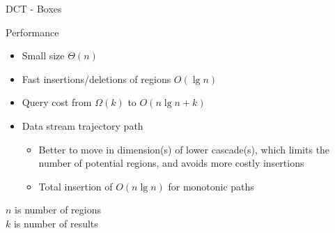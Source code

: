 \documentclass[final,total,bgColor,slideColor,pdf,ps2pdf,default,noaccumulate]{prosper}
\begin{document}
% 

% 

\begin{slide}{DCT - Boxes}
  \centering
  \scalebox{0.8}{}
\end{slide}

\begin{slide}[R]{Performance}
  \begin{itemize}    
  \item Small size $\Theta(n)$
  \item Fast insertions/deletions of regions $O(\lg{n})$ 
  \item Query cost from $\Omega(k)$ to $O(n\lg{n}+k)$
  \item Data stream trajectory path
    \begin{itemize}
    \item Better to move in dimension(s) of lower cascade(s), which
      limits the number of potential regions, and avoids more costly
      insertions
    \item Total insertion of $O(n\lg{n})$ for monotonic paths
    \end{itemize}
  \end{itemize}
  \hfill $n$ is number of regions \\
  \hfill $k$ is number of results 
\end{slide}
\end{document}
